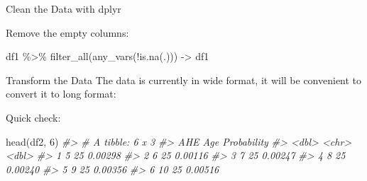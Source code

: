 \documentclass[
  11pt,
  ignorenonframetext,
  svgnames, handout, t]{beamer}
\newenvironment{Shaded}{\begin{snugshade}}{\end{snugshade}}
\newcommand{\CommentTok}[1]{\textcolor[rgb]{0.56,0.35,0.01}{\textit{#1}}}
\newcommand{\DecValTok}[1]{\textcolor[rgb]{0.00,0.00,0.81}{#1}}
\newcommand{\FunctionTok}[1]{\textcolor[rgb]{0.00,0.00,0.00}{#1}}
\newcommand{\NormalTok}[1]{#1}
\newcommand{\OtherTok}[1]{\textcolor[rgb]{0.56,0.35,0.01}{#1}}
\newcommand{\SpecialCharTok}[1]{\textcolor[rgb]{0.00,0.00,0.00}{#1}}
\newcommand{\StringTok}[1]{\textcolor[rgb]{0.31,0.60,0.02}{#1}}
\begin{document}
\begin{frame}[fragile]{Clean the Data \textbar{} with dplyr}
\normalsize

Remove the empty columns:

\footnotesize

\begin{Shaded}
\begin{Highlighting}[]
\NormalTok{df1 }\SpecialCharTok{\%\textgreater{}\%} \FunctionTok{filter\_all}\NormalTok{(}\FunctionTok{any\_vars}\NormalTok{(}\SpecialCharTok{!}\FunctionTok{is.na}\NormalTok{(.))) }\OtherTok{{-}\textgreater{}}\NormalTok{ df1}
\end{Highlighting}
\end{Shaded}

\normalsize
\end{frame}

\begin{frame}[fragile]{Transform the Data}
\protect\hypertarget{transform-the-data}{}
The data is currently in wide format, it will be convenient to convert
it to long format:

\footnotesize

\begin{Shaded}
\end{Shaded}

\normalsize

Quick check:

\footnotesize

\begin{Shaded}
\begin{Highlighting}[]
\FunctionTok{head}\NormalTok{(df2, }\DecValTok{6}\NormalTok{)}
\CommentTok{\#\textgreater{} \# A tibble: 6 x 3}
\CommentTok{\#\textgreater{}     AHE Age   Probability}
\CommentTok{\#\textgreater{}   \textless{}dbl\textgreater{} \textless{}chr\textgreater{}       \textless{}dbl\textgreater{}}
\CommentTok{\#\textgreater{} 1     5 25        0.00298}
\CommentTok{\#\textgreater{} 2     6 25        0.00116}
\CommentTok{\#\textgreater{} 3     7 25        0.00247}
\CommentTok{\#\textgreater{} 4     8 25        0.00240}
\CommentTok{\#\textgreater{} 5     9 25        0.00356}
\CommentTok{\#\textgreater{} 6    10 25        0.00516}
\end{Highlighting}
\end{Shaded}


\end{frame}
\end{document}
